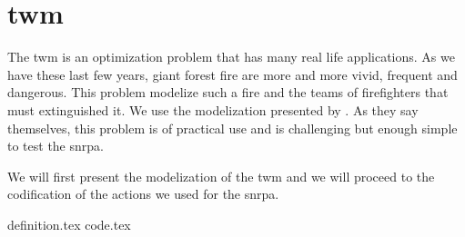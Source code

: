 \section{\acrlong{twm}}%
\label{sec:twm}

The \gls{twm} is an optimization problem that has many real life applications.
As we have these last few years, giant forest fire are more and more vivid, frequent and dangerous.
This problem modelize such a fire and the teams of firefighters that must extinguished it.
We use the modelization presented by \citeauthor{comp_mcts_mo}\cite{comp_mcts_mo}.
As they say themselves, this problem is of practical use and is challenging but enough simple to test the \gls{snrpa}.

We will first present the modelization of the \gls{twm} and we will proceed to the codification of the actions we used for the \gls{snrpa}.

{definition.tex}
{code.tex}


